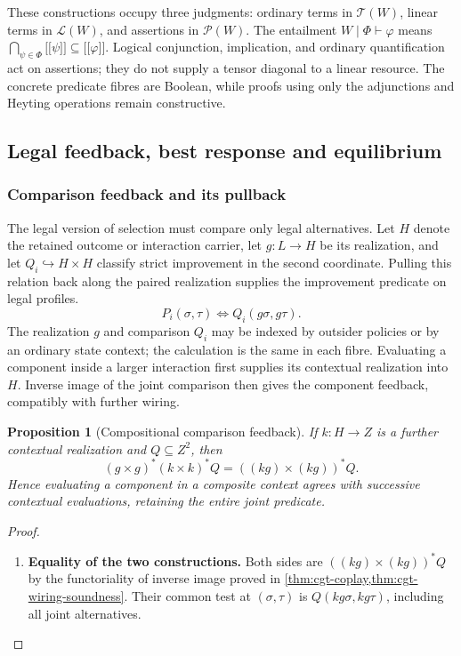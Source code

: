 \documentclass[11pt,a4paper]{article}
\numberwithin{equation}{section}
\newtheorem{proposition}[theorem]{Proposition}
\theoremstyle{definition}
\theoremstyle{remark}
\theoremstyle{plain}
\providecommand{\cT}{\mathcal{T}}
\providecommand{\cL}{\mathcal{L}}
\providecommand{\cP}{\mathcal{P}}
\providecommand{\llbracket}{\mathopen{[\![}}
\providecommand{\rrbracket}{\mathclose{]\!]}}
\providecommand{\sem}[1]{\llbracket #1\rrbracket}
\begin{document}
These constructions occupy three judgments: ordinary terms in
$\cT(W)$, linear terms in $\cL(W)$, and assertions in $\cP(W)$.
The entailment $W\mid\Phi\vdash\varphi$ means
$\bigcap_{\psi\in\Phi}\sem\psi\subseteq\sem\varphi$.
Logical conjunction, implication, and ordinary quantification act on
assertions; they do not supply a tensor diagonal to a linear resource.
The concrete predicate fibres are Boolean, while proofs using only the
adjunctions and Heyting operations remain constructive.

\subsection{Legal feedback, best response and equilibrium}
\label{agt-sec-equilibrium}

\subsubsection{Comparison feedback and its pullback}

The legal version of selection must compare only legal alternatives.
Let $H$ denote the retained outcome or interaction carrier, let
$g:L\to H$ be its realization, and let
$Q_i\hookrightarrow H\times H$ classify strict improvement in the
second coordinate. Pulling this relation back along the paired
realization supplies the improvement predicate on legal profiles.
\[
 P_i(\sigma,\tau)\iff Q_i(g\sigma,g\tau).
\]
The realization $g$ and comparison $Q_i$ may be indexed by outsider policies or by an ordinary
state context; the calculation is the same in each fibre. Evaluating a
component inside a larger interaction first supplies its contextual
realization into $H$. Inverse image of the joint comparison then gives
the component feedback, compatibly with further wiring.

\begin{proposition}[Compositional comparison feedback]
\label{agt-prop-feedback}
If $k:H\to Z$ is a further contextual realization and $Q\subseteq Z^2$,
then
\[
 (g\times g)^*(k\times k)^*Q
 =((kg)\times(kg))^*Q.
\]
Hence evaluating a component in a composite context agrees with successive
contextual evaluations, retaining the entire joint predicate.
\end{proposition}
\begin{proof}
\leavevmode
\begin{enumerate}[label=\textup{(\arabic*)},leftmargin=*,itemsep=4pt,topsep=3pt]
  \item \textbf{Equality of the two constructions.} Both sides are $((kg)\times(kg))^*Q$ by the functoriality of
inverse image proved in \cref{thm:cgt-coplay,thm:cgt-wiring-soundness}. Their common test at $(\sigma,\tau)$ is
$Q(kg\sigma,kg\tau)$, including all joint alternatives.
\end{enumerate}
\end{proof}
\end{document}
